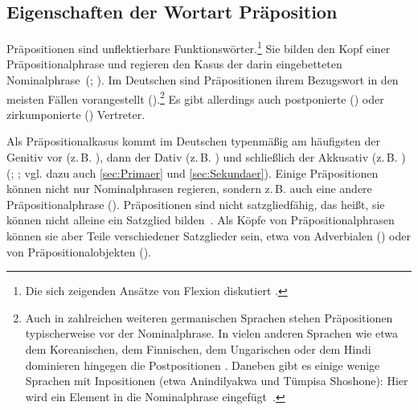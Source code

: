\subsection{Eigenschaften der Wortart Präposition} \label{sec:Wortart}
Präpositionen sind unflektierbare Funktionswörter.\footnote{Die sich zeigenden Ansätze von Flexion diskutiert \citet{Nubling2005}.} 
Sie bilden den Kopf einer Pr{\"a}positionalphrase und regieren den Kasus der darin eingebetteten Nominalphrase~(\citealp[s.][630]{Griehaber2009}; \citealp[182]{Eisenberg.2013}). 
Im Deutschen sind Präpositionen ihrem Bezugswort in den meisten Fällen vorangestellt ().\footnote{Auch in zahlreichen weiteren germanischen Sprachen stehen Präpositionen typischerweise vor der Nominalphrase. In vielen anderen Sprachen wie etwa dem Koreanischen, dem Finnischen, dem Ungarischen oder dem Hindi dominieren hingegen die Postpositionen \citep[s.][]{Dryer2013}. 
Daneben gibt es einige wenige Sprachen mit Inpositionen (etwa Anindilyakwa und Tümpisa Shoshone): Hier wird ein Element in die Nominalphrase eingefügt~\citep[s.][]{Dryer2013}.}
Es gibt allerdings auch postponierte () oder zirkumponierte () Vertreter. 

Als Präpositionalkasus kommt im Deutschen typenmäßig am häufigsten der Genitiv vor (z.\,B. ), dann der Dativ (z.\,B. ) und schließlich der Akkusativ (z.\,B. ) (\citealp[s. etwa][131--132]{Eroms1981}; \citealp[638]{Griehaber2009}; vgl. dazu auch \autoref{sec:Primaer} und \autoref{sec:Sekundaer}). 
Einige Präpositionen können nicht nur Nominalphrasen regieren, sondern z.\,B. auch eine andere Präpositionalphrase (). 
Pr{\"a}positionen sind nicht satzgliedf{\"a}hig, das hei{\ss}t, sie k{\"o}nnen nicht alleine ein Satzglied bilden~\citep[s.][633]{Griehaber2009}.
Als Köpfe von Präpositionalphrasen können sie aber Teile verschiedener Satzglieder sein, etwa von Adverbialen () oder von Präpositionalobjekten (). 

